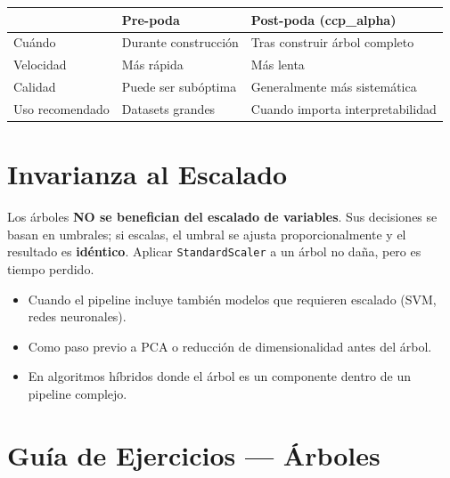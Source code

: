 \documentclass[11pt, a4paper]{book}
\begin{document}
\begin{resumen}
  \begin{tabular}{lll}
    \toprule
    & \textbf{Pre-poda} & \textbf{Post-poda (ccp\_alpha)}\\
    \midrule
    Cuándo & Durante construcción & Tras construir árbol completo\\
    Velocidad & Más rápida & Más lenta\\
    Calidad & Puede ser subóptima & Generalmente más sistemática\\
    Uso recomendado & Datasets grandes & Cuando importa interpretabilidad\\
    \bottomrule
  \end{tabular}
\end{resumen}

\section{Invarianza al Escalado}

\begin{critico}
  Los árboles \textbf{NO se benefician del escalado de variables}.
  Sus decisiones se basan en umbrales; si escalas, el umbral se ajusta proporcionalmente
  y el resultado es \textbf{idéntico}. Aplicar \texttt{StandardScaler} a un árbol no daña,
  pero es tiempo perdido.
\end{critico}

\begin{cuando}
  \begin{itemize}
    \item Cuando el pipeline incluye también modelos que requieren escalado (SVM, redes neuronales).
    \item Como paso previo a PCA o reducción de dimensionalidad antes del árbol.
    \item En algoritmos híbridos donde el árbol es un componente dentro de un pipeline complejo.
  \end{itemize}
\end{cuando}

\section{Guía de Ejercicios — Árboles}
\end{document}
